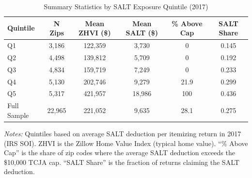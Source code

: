\begin{table}[H]
\centering
\caption{Summary Statistics by SALT Exposure Quintile (2017)}
\begin{threeparttable}
\begin{tabular}{l S[table-format=5.0] S[table-format=6.0] S[table-format=5.0] S[table-format=3.1] S[table-format=1.3]}
\toprule
Quintile & {N Zips} & {Mean ZHVI (\$)} & {Mean SALT (\$)} & {\% Above Cap} & {SALT Share} \\
\midrule
Q1 & 3,186 & 122,359 & 3,730 & 0 & 0.145 \\
Q2 & 4,498 & 139,812 & 5,709 & 0 & 0.192 \\
Q3 & 4,834 & 159,719 & 7,249 & 0 & 0.233 \\
Q4 & 5,130 & 202,746 & 9,279 & 21.9 & 0.299 \\
Q5 & 5,317 & 421,957 & 18,986 & 100 & 0.436 \\
\midrule
Full Sample & 22,965 & 221,052 & 9,635 & 28.1 & 0.275 \\
\bottomrule
\end{tabular}
\begin{tablenotes}[flushleft]
\small
\item \textit{Notes:} Quintiles based on average SALT deduction per itemizing return in 2017 (IRS SOI). ZHVI is the Zillow Home Value Index (typical home value). ``\% Above Cap'' is the share of zip codes where the average SALT deduction exceeds the \$10,000 TCJA cap. ``SALT Share'' is the fraction of returns claiming the SALT deduction.
\end{tablenotes}
\end{threeparttable}
\label{tab:summary}
\end{table}

